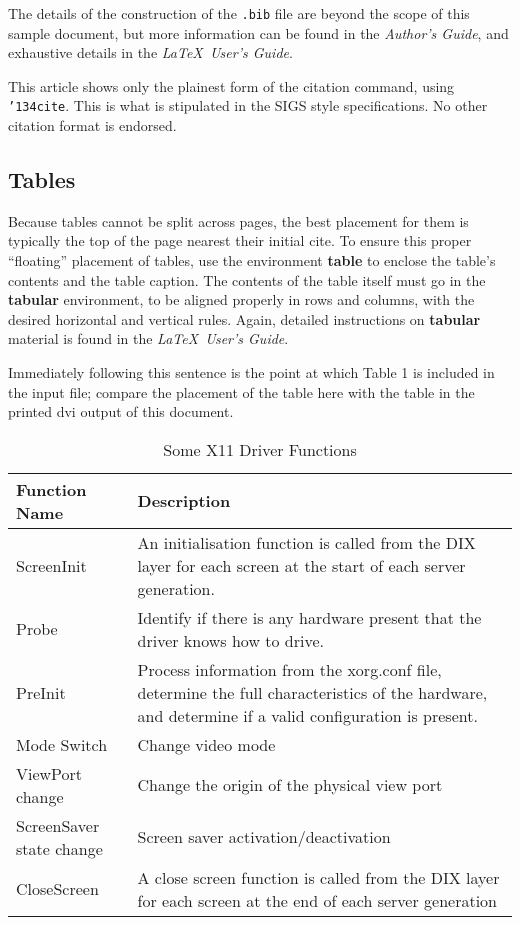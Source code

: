 \documentclass{acm_proc_article-sp}
\begin{document}
The details of the construction of the \texttt{.bib} file
are beyond the scope of this sample document, but more
information can be found in the \textit{Author's Guide},
and exhaustive details in the \textit{\LaTeX\ User's
Guide}\cite{Lamport:LaTeX}.

This article shows only the plainest form
of the citation command, using \texttt{{\char'134}cite}.
This is what is stipulated in the SIGS style specifications.
No other citation format is endorsed.

\subsection{Tables}
Because tables cannot be split across pages, the best
placement for them is typically the top of the page
nearest their initial cite.  To
ensure this proper ``floating'' placement of tables, use the
environment \textbf{table} to enclose the table's contents and
the table caption.  The contents of the table itself must go
in the \textbf{tabular} environment, to
be aligned properly in rows and columns, with the desired
horizontal and vertical rules.  Again, detailed instructions
on \textbf{tabular} material
is found in the \textit{\LaTeX\ User's Guide}.

Immediately following this sentence is the point at which
Table 1 is included in the input file; compare the
placement of the table here with the table in the printed
dvi output of this document.
\begin{table}
\caption{Some X11 Driver Functions}
\begin{tabular}{|l|p{4cm} |} \hline
\textbf{Function Name}&\textbf{Description}\\ \hline
ScreenInit & An initialisation function is called from the DIX layer for each screen at the start of each server generation.\\ \hline
Probe & Identify if there is any hardware present that the driver knows how to drive.\\ \hline
PreInit & Process information from the xorg.conf file, determine the full characteristics of the hardware, and determine if a valid configuration is present. \\ \hline
Mode Switch & Change video mode \\ \hline
ViewPort change & Change the origin of the physical view port \\ \hline
ScreenSaver state change & Screen saver activation/deactivation \\ \hline
CloseScreen & A close screen function is called from the DIX layer for each screen at the end of each server generation \\ \hline
\hline\end{tabular}
\end{table}
\end{document}
